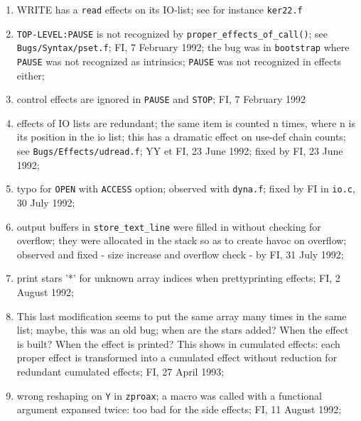 \begin{enumerate}
  \item WRITE has a \verb+read+ effects on its IO-list; see for instance
        \verb+ker22.f+

  \item \verb+TOP-LEVEL:PAUSE+ is not recognized by 
        \verb+proper_effects_of_call()+;
        see \verb+Bugs/Syntax/pset.f+; FI, 7 February 1992;
        the bug was in \verb+bootstrap+ where \verb+PAUSE+ was not
        recognized as intrinsics; \verb+PAUSE+ was not recognized
        in effects either;

  \item control effects are ignored in \verb+PAUSE+ and \verb+STOP+;
        FI, 7 February 1992

  \item effects of IO lists are redundant; the same item is counted
        n times, where n is its position in the io list;
        this has a dramatic effect on use-def chain counts;
        see \verb+Bugs/Effects/udread.f+; YY et FI, 23 June 1992;
        fixed by FI, 23 June 1992;

  \item typo for \verb+OPEN+ with \verb+ACCESS+ option; observed
        with \verb+dyna.f+; fixed by FI in \verb+io.c+, 30 July 1992;

  \item output buffers in \verb+store_text_line+ were filled in without
        checking for overflow; they were allocated in the stack so
        as to create havoc on overflow; observed and fixed - size
        increase and overflow check - by FI,
        31 July 1992;

  \item print stars '*' for unknown array indices when prettyprinting
        effects; FI, 2 August 1992;

  \item This last modification seems to put the same array many times in
        the same list; maybe, this was an old bug; when are the stars
        added? When the effect is built? When the effect is printed?
        This shows in cumulated effects: each proper effect is
        transformed into a cumulated effect without reduction for
        redundant cumulated effects; FI, 27 April 1993;

  \item wrong reshaping on \verb+Y+ in \verb+zproax+; a macro was
        called with a functional argument expansed twice: too bad
        for the side effects; FI, 11 August 1992;


\end{enumerate}
